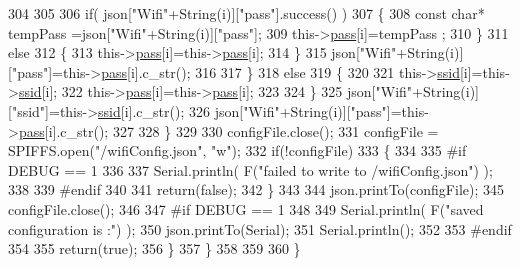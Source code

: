 \begin{DoxyCode}
304                     
305                     
306                     \textcolor{keywordflow}{if}( json[\textcolor{stringliteral}{"Wifi"}+String(i)][\textcolor{stringliteral}{"pass"}].success() )
307                     \{
308                         \textcolor{keyword}{const} \textcolor{keywordtype}{char}* tempPass =json[\textcolor{stringliteral}{"Wifi"}+String(i)][\textcolor{stringliteral}{"pass"}];
309                         this->\hyperlink{classCoolWifi_a0c3332a149245aaad060b32593a54c9b}{pass}[i]=tempPass ;                    
310                     \}
311                     \textcolor{keywordflow}{else}
312                     \{
313                         this->\hyperlink{classCoolWifi_a0c3332a149245aaad060b32593a54c9b}{pass}[i]=this->\hyperlink{classCoolWifi_a0c3332a149245aaad060b32593a54c9b}{pass}[i];                    
314                     \}
315                     json[\textcolor{stringliteral}{"Wifi"}+String(i)][\textcolor{stringliteral}{"pass"}]=this->\hyperlink{classCoolWifi_a0c3332a149245aaad060b32593a54c9b}{pass}[i].c\_str();           
316                 
317                 \}
318                 \textcolor{keywordflow}{else}
319                 \{
320                     
321                     this->\hyperlink{classCoolWifi_a893b21d0fed821438733bba2e73fb4c2}{ssid}[i]=this->\hyperlink{classCoolWifi_a893b21d0fed821438733bba2e73fb4c2}{ssid}[i];
322                     this->\hyperlink{classCoolWifi_a0c3332a149245aaad060b32593a54c9b}{pass}[i]=this->\hyperlink{classCoolWifi_a0c3332a149245aaad060b32593a54c9b}{pass}[i];                    
323                     
324                 \}
325                 json[\textcolor{stringliteral}{"Wifi"}+String(i)][\textcolor{stringliteral}{"ssid"}]=this->\hyperlink{classCoolWifi_a893b21d0fed821438733bba2e73fb4c2}{ssid}[i].c\_str();
326                 json[\textcolor{stringliteral}{"Wifi"}+String(i)][\textcolor{stringliteral}{"pass"}]=this->\hyperlink{classCoolWifi_a0c3332a149245aaad060b32593a54c9b}{pass}[i].c\_str();           
327                         
328             \}
329 
330             configFile.close();
331             configFile = SPIFFS.open(\textcolor{stringliteral}{"/wifiConfig.json"}, \textcolor{stringliteral}{"w"});
332             \textcolor{keywordflow}{if}(!configFile)
333             \{
334             
335 \textcolor{preprocessor}{            #if DEBUG == 1 }
336 
337                 Serial.println( F(\textcolor{stringliteral}{"failed to write to /wifiConfig.json"}) );
338             
339 \textcolor{preprocessor}{            #endif}
340 
341                 \textcolor{keywordflow}{return}(\textcolor{keyword}{false});              
342             \}
343             
344             json.printTo(configFile);
345             configFile.close();
346 
347 \textcolor{preprocessor}{        #if DEBUG == 1 }
348 
349             Serial.println( F(\textcolor{stringliteral}{"saved configuration is :"}) );
350             json.printTo(Serial);
351             Serial.println();
352         
353 \textcolor{preprocessor}{        #endif}
354 
355             \textcolor{keywordflow}{return}(\textcolor{keyword}{true}); 
356         \}
357     \}   
358     
359 
360 \}
\end{DoxyCode}
